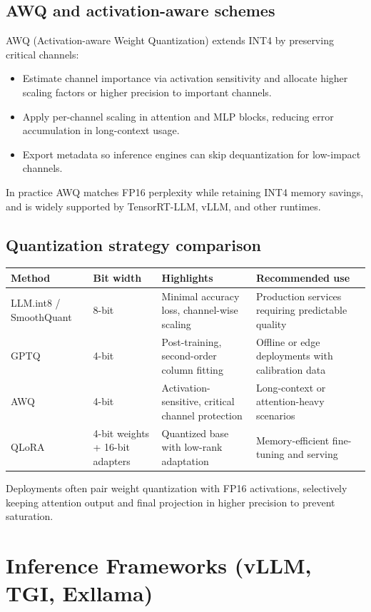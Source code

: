 \documentclass{article}
\begin{document}
\subsection{AWQ and activation-aware schemes}
AWQ (Activation-aware Weight Quantization) extends INT4 by preserving critical channels:
\begin{itemize}
  \item Estimate channel importance via activation sensitivity and allocate higher scaling factors or higher precision to important channels.
  \item Apply per-channel scaling in attention and MLP blocks, reducing error accumulation in long-context usage.
  \item Export metadata so inference engines can skip dequantization for low-impact channels.
\end{itemize}
In practice AWQ matches FP16 perplexity while retaining INT4 memory savings, and is widely supported by TensorRT-LLM, vLLM, and other runtimes.

\subsection{Quantization strategy comparison}
\begin{longtable}{p{3cm}p{3cm}p{4cm}p{4cm}}
\toprule
Method & Bit width & Highlights & Recommended use \\
\midrule
LLM.int8 / SmoothQuant & 8-bit & Minimal accuracy loss, channel-wise scaling & Production services requiring predictable quality \\
GPTQ & 4-bit & Post-training, second-order column fitting & Offline or edge deployments with calibration data \\
AWQ & 4-bit & Activation-sensitive, critical channel protection & Long-context or attention-heavy scenarios \\
QLoRA & 4-bit weights + 16-bit adapters & Quantized base with low-rank adaptation & Memory-efficient fine-tuning and serving \\
\bottomrule
\end{longtable}
Deployments often pair weight quantization with FP16 activations, selectively keeping attention output and final projection in higher precision to prevent saturation.

\section{Inference Frameworks (vLLM, TGI, Exllama)}
\end{document}
